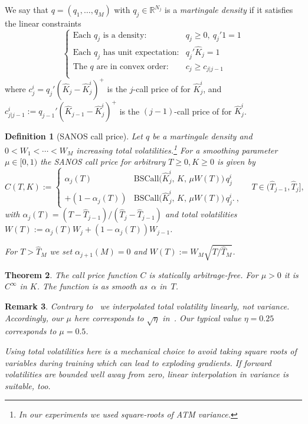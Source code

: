 \documentclass[11pt,a4paper]{article}
\newtheorem{definition}{Definition}[section]
\newtheorem{theorem}[definition]{Theorem}
\newtheorem{remark}[definition]{Remark}
\newcommand{\R}{\mathbb{R}}
\newcommand{\BSCall}{\mathrm{BSCall}}
\begin{document}
We say that $q=(q_1,\ldots,q_M)$ with $q_j\in\R^{N_j}$ is a \emph{martingale density} if
it satisfies the linear constraints
\begin{equation}\label{eq:qocnd}
    \left\{
    \begin{array}{ll}
        \mbox{Each $q_j$ is a density:} & q_j\geq 0,\ q_j'1 = 1 \\
        \mbox{Each $q_j$ has unit expectation:} & q_j' \hat K_j=1 \\
        \mbox{The $q$ are in convex order:}&
            c_j \geq c_{j|j-1}
            \\
    \end{array}
    \right.
\end{equation}
where $c^i_j = q_j' (\hat K_j-\hat K^i_j)^+$ is the $j$-call price of for $\hat K^i_j$,
and $c^i_{j|j-1} := q_{j-1}' (\hat K_{j-1}-\hat K^i_j)^+$ is the $(j-1)$-call price of for
$\hat K^i_j$.

\begin{definition}[SANOS call price]
\label{def:sanos}
Let $q$ be a martingale density and $0<W_1< \cdots < W_M$
increasing total volatilities.\footnote{In our experiments we used square-roots of ATM variance.}
For a smoothing parameter $\mu \in [0,1)$ 
the SANOS call price 
 for arbitrary $T\geq0 ,K\geq 0$ 
is given by
\begin{equation}
  \label{eq:sanos_interp}
  C(T,K) := \left\{
    \begin{array}{rll} \alpha_j(T) & \BSCall\!\bigl(\hat K_j^i,\,K,\,\mu W(T)\bigr)\,q_j^i  \\
         + (1-\alpha_j(T)) & \BSCall\!\bigl(\hat K_j^i,\,K,\,\mu W(T)\bigr)\,q_j^i. \ ,
        \end{array}
        \right.
  \quad T \in (\hat T_{j-1}, \hat T_j],
\end{equation}
with $\alpha_j(T) = (T - \hat T_{j-1})/(\hat T_j - \hat T_{j-1})$
and total volatilities  $W(T) := \alpha_j(T) W_j + (1-\alpha_j(T)) W_{j-1}$.

For $T>\hat T_M$ we set $\alpha_{j+1}(M)=0$ and $W(T):=W_M\sqrt{T / \hat T_M}$.
\end{definition}


\begin{theorem}
    The call price function $C$ is statically arbitrage-free.
For $\mu > 0$ it is $C^\infty$ in $K$. The function is as smooth as~$\alpha$ in~$T$.
\end{theorem}

\begin{remark}
    Contrary to~\cite{SANOS2026} we interpolated total volatility linearly, not variance.
    Accordingly, our $\mu$ here corresponds to $\sqrt{\eta}$ in~\cite{SANOS2026}.
    Our typical value $\eta=0.25$ corresponds to $\mu=0.5$.
    
    Using total volatilities here is a mechanical choice to avoid taking square roots of variables during training
    which can lead to exploding gradients. If forward volatilities are bounded well away from
    zero, linear interpolation in variance is suitable, too.
\end{remark}
\end{document}
